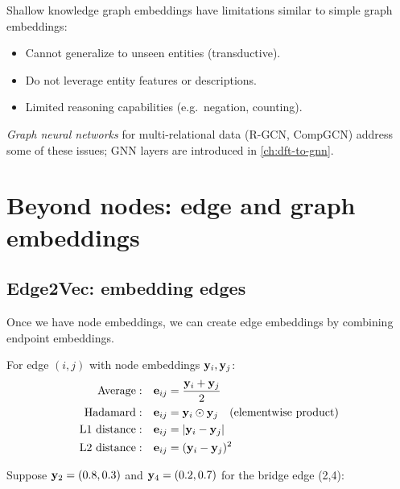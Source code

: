 \begin{notechapter}
\begin{remark}
Shallow knowledge graph embeddings have limitations similar to simple graph embeddings:
\begin{itemize}
    \item Cannot generalize to unseen entities (transductive).
    \item Do not leverage entity features or descriptions.
    \item Limited reasoning capabilities (e.g.\ negation, counting).
\end{itemize}
\emph{Graph neural networks} for multi-relational data (R-GCN, CompGCN) address some of these issues; GNN layers are introduced in \cref{ch:dft-to-gnn}.
\end{remark}


\section{Beyond nodes: edge and graph embeddings}

\subsection{Edge2Vec: embedding edges}

Once we have node embeddings, we can create edge embeddings by combining endpoint embeddings.

\begin{definition}
For edge $(i, j)$ with node embeddings $\mathbf{y}_i, \mathbf{y}_j$:
\begin{align*}
\text{Average}: & \quad \mathbf{e}_{ij} = \frac{\mathbf{y}_i + \mathbf{y}_j}{2} \\
\text{Hadamard}: & \quad \mathbf{e}_{ij} = \mathbf{y}_i \odot \mathbf{y}_j \quad \text{(elementwise product)} \\
\text{L1 distance}: & \quad \mathbf{e}_{ij} = |\mathbf{y}_i - \mathbf{y}_j| \\
\text{L2 distance}: & \quad \mathbf{e}_{ij} = (\mathbf{y}_i - \mathbf{y}_j)^2
\end{align*}
\end{definition}

\begin{example}
Suppose $\mathbf{y}_2 = (0.8, 0.3)$ and $\mathbf{y}_4 = (0.2, 0.7)$ for the bridge edge (2,4):


\end{example}
\end{notechapter}
